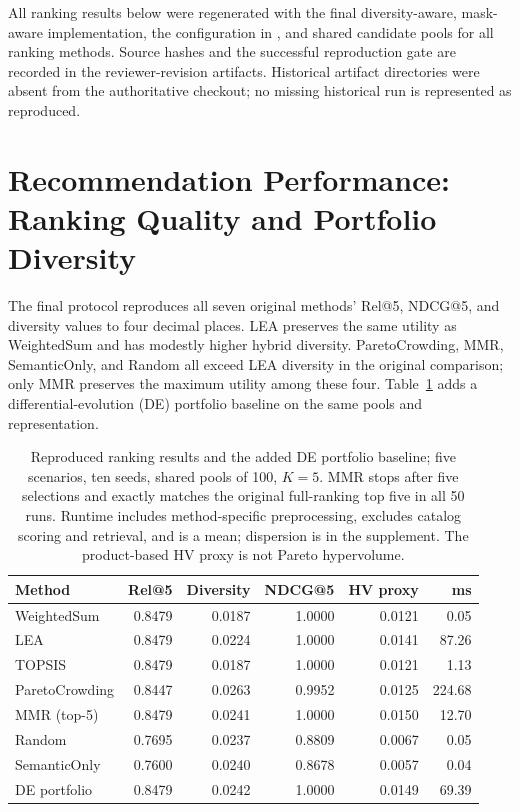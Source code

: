 \documentclass[12pt,a4paper]{article}
\begin{document}
All ranking results below were regenerated with the final diversity-aware, mask-aware implementation, the configuration in , and shared candidate pools for all ranking methods. Source hashes and the successful reproduction gate are recorded in the reviewer-revision artifacts. Historical artifact directories were absent from the authoritative checkout; no missing historical run is represented as reproduced.

\section{Recommendation Performance: Ranking Quality and Portfolio Diversity}
\label{sec:results}

The final protocol reproduces all seven original methods' Rel@5, NDCG@5, and diversity values to four decimal places. LEA preserves the same utility as WeightedSum and has modestly higher hybrid diversity. ParetoCrowding, MMR, SemanticOnly, and Random all exceed LEA diversity in the original comparison; only MMR preserves the maximum utility among these four. Table~\ref{tab:ranking} adds a differential-evolution (DE) portfolio baseline on the same pools and representation.

\begin{table}[H]\centering\small
\caption{Reproduced ranking results and the added DE portfolio baseline; five scenarios, ten seeds, shared pools of 100, $K=5$. MMR stops after five selections and exactly matches the original full-ranking top five in all 50 runs. Runtime includes method-specific preprocessing, excludes catalog scoring and retrieval, and is a mean; dispersion is in the supplement. The product-based HV proxy is not Pareto hypervolume.}\label{tab:ranking}
\begin{tabular}{lrrrrr}
\toprule
Method & Rel@5 & Diversity & NDCG@5 & HV proxy & ms\\\midrule
WeightedSum & 0.8479 & 0.0187 & 1.0000 & 0.0121 & 0.05\\
LEA & 0.8479 & 0.0224 & 1.0000 & 0.0141 & 87.26\\
TOPSIS & 0.8479 & 0.0187 & 1.0000 & 0.0121 & 1.13\\
ParetoCrowding & 0.8447 & 0.0263 & 0.9952 & 0.0125 & 224.68\\
MMR (top-5) & 0.8479 & 0.0241 & 1.0000 & 0.0150 & 12.70\\
Random & 0.7695 & 0.0237 & 0.8809 & 0.0067 & 0.05\\
SemanticOnly & 0.7600 & 0.0240 & 0.8678 & 0.0057 & 0.04\\
DE portfolio & 0.8479 & 0.0242 & 1.0000 & 0.0149 & 69.39\\
\bottomrule\end{tabular}\end{table}
\end{document}
